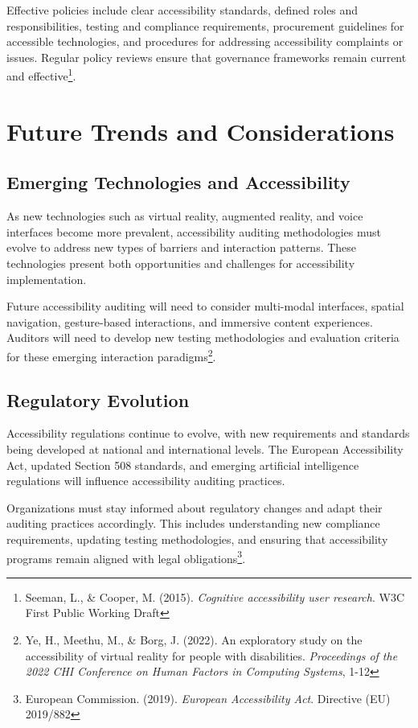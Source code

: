 Effective policies include clear accessibility standards, defined roles and responsibilities, testing and compliance requirements, procurement guidelines for accessible technologies, and procedures for addressing accessibility complaints or issues. Regular policy reviews ensure that governance frameworks remain current and effective\footnote{Seeman, L., \& Cooper, M. (2015). \textit{Cognitive accessibility user research}. W3C First Public Working Draft}.

\section{Future Trends and Considerations}

\subsection{Emerging Technologies and Accessibility}

As new technologies such as virtual reality, augmented reality, and voice interfaces become more prevalent, accessibility auditing methodologies must evolve to address new types of barriers and interaction patterns. These technologies present both opportunities and challenges for accessibility implementation.

Future accessibility auditing will need to consider multi-modal interfaces, spatial navigation, gesture-based interactions, and immersive content experiences. Auditors will need to develop new testing methodologies and evaluation criteria for these emerging interaction paradigms\footnote{Ye, H., Meethu, M., \& Borg, J. (2022). An exploratory study on the accessibility of virtual reality for people with disabilities. \textit{Proceedings of the 2022 CHI Conference on Human Factors in Computing Systems}, 1-12}.

\subsection{Regulatory Evolution}

Accessibility regulations continue to evolve, with new requirements and standards being developed at national and international levels. The European Accessibility Act, updated Section 508 standards, and emerging artificial intelligence regulations will influence accessibility auditing practices.

Organizations must stay informed about regulatory changes and adapt their auditing practices accordingly. This includes understanding new compliance requirements, updating testing methodologies, and ensuring that accessibility programs remain aligned with legal obligations\footnote{European Commission. (2019). \textit{European Accessibility Act}. Directive (EU) 2019/882}.


